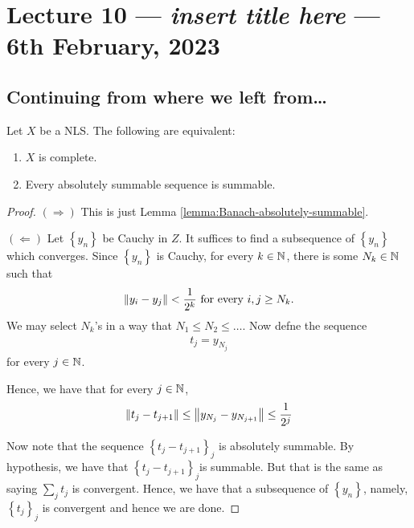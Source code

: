 \section{Lecture 10 --- \textit{insert title here} --- 6th February, 2023}
\horz
\subsection{Continuing from where we left from\ldots}


\begin{theorem}
    Let $X$ be a NLS. The following are equivalent:
    \begin{enumerate}
	\item $X$ is complete.
	\item Every absolutely summable sequence is summable.
    \end{enumerate}
    \label{thm:equivalent-thm-Banach}
\end{theorem}
\begin{proof}
    $\left( \Longrightarrow \right)$ This is just Lemma \ref{lemma:Banach-absolutely-summable}.

    $\left( \Longleftarrow \right)$ Let $\left\{ y_{n} \right\}$ be Cauchy in $Z$. It suffices to find a subsequence of $\left\{ y_{n} \right\}$ which converges. Since $\left\{ y_n \right\}$ is Cauchy, for every $k\in \mathbb N$, there is some $N_{k} \in \mathbb N$ such that 
    \begin{align*}
	\left\lVert y_{i} - y_{j} \right\rVert < \frac{1}{2^{k}} \text{ for every } i, j \ge N_{k}\text{.}
    \end{align*}
    We may select $N_{k}$'s in a way that $N_{1} \le N_{2} \le \ldots$. Now defne the sequence
    \begin{align*}
	t_{j} = y_{N_{j}}
    \end{align*}
    for every $j \in \mathbb N$.

    Hence, we have that for every $j \in \mathbb N$,
    \begin{align*}
    \left\lVert t_{j} - t_{j+1} \right\rVert \le \left\lVert y_{N_{j}} - y_{N_{j+1}} \right\rVert \le \frac{1}{2^{j}}
    \end{align*}
    
    Now note that the sequence $\left\{ t_{j} - t_{j+1} \right\}_{j}$ is absolutely summable. By hypothesis, we have that $\left\{ t_{j} - t_{j+1} \right\}_{j}$is summable. But that is the same as saying $\sum_{j} {t_j}$ is convergent. Hence, we have that a subsequence of $\left\{ y_{n} \right\}$, namely, $\left\{ t_{j} \right\}_{j}$ is convergent and hence we are done.
\end{proof}

